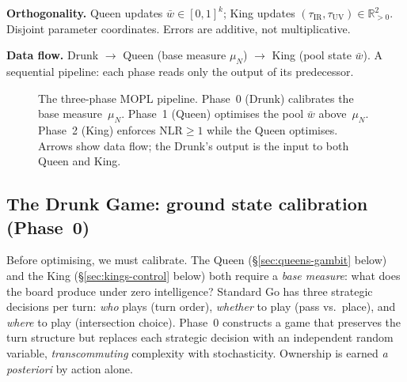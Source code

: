 \documentclass[11pt,a4paper]{article}
\begin{document}
\medskip\noindent
\textbf{Orthogonality.}\;
Queen updates $\bar{w} \in [0,1]^k$;
King updates $(\tau_{\mathrm{IR}}, \tau_{\mathrm{UV}}) \in \mathbb{R}_{>0}^2$.
Disjoint parameter coordinates.
Errors are additive, not multiplicative.

\medskip\noindent
\textbf{Data flow.}\;
Drunk $\to$ Queen (base measure $\mu_N$)
$\to$ King (pool state $\bar{w}$).
A sequential pipeline: each phase reads only
the output of its predecessor.

\begin{figure}[ht]
\centering

\caption{The three-phase MOPL pipeline.
  Phase~0 (Drunk) calibrates the base measure~$\mu_N$.
  Phase~1 (Queen) optimises the pool $\bar{w}$ above~$\mu_N$.
  Phase~2 (King) enforces $\mathrm{NLR} \geq 1$ while
  the Queen optimises.
  Arrows show data flow; the Drunk's output is the input
  to both Queen and King.}\label{fig:drunk-flow}
\end{figure}

\subsection{The Drunk Game: ground state calibration (Phase~0)}%
\label{sec:drunk-game}

Before optimising, we must calibrate.
The Queen (\S\ref{sec:queens-gambit} below) and the King
(\S\ref{sec:kings-control} below) both require a
\emph{base measure}: what does the board produce under
zero intelligence?
Standard Go has three strategic decisions per turn:
\emph{who} plays (turn order),
\emph{whether} to play (pass vs.\ place), and
\emph{where} to play (intersection choice).
Phase~0 constructs a game that preserves the turn
structure but replaces each strategic decision with an
independent random variable,
\emph{transcommuting} complexity with stochasticity.
Ownership is earned \emph{a posteriori} by action alone.
\end{document}
